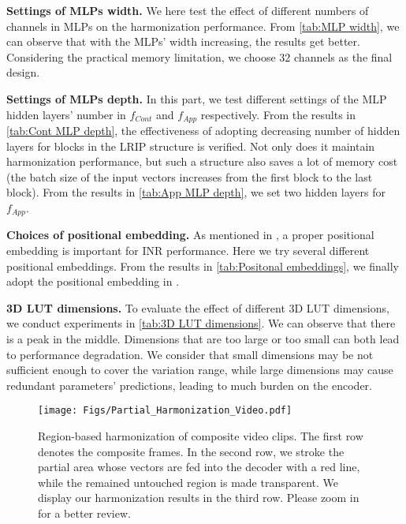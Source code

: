 \documentclass[10pt,journal,twocolumn,twoside]{IEEEtran}
\begin{document}
\textbf{Settings of MLPs width.} We here test the effect of different numbers of channels in MLPs on the harmonization performance. From \cref{tab:MLP width}, we can observe that with the MLPs' width increasing, the results get better. Considering the practical memory limitation, we choose 32 channels as the final design.

\textbf{Settings of MLPs depth.} In this part, we test different settings of the MLP hidden layers' number in $f_{Cont}$ and $f_{App}$ respectively. From the results in \cref{tab:Cont MLP depth}, the effectiveness of adopting decreasing number of hidden layers for blocks in the LRIP structure is verified. Not only does it maintain harmonization performance, but such a structure also saves a lot of memory cost (the batch size of the input vectors increases from the first block to the last block). From the results in \cref{tab:App MLP depth}, we set two hidden layers for $f_{App}$.

\textbf{Choices of positional embedding.} As mentioned in \cite{mildenhall2021nerf, tancik2020fourier}, a proper positional embedding is important for INR performance. Here we try several different positional embeddings\cite{mildenhall2021nerf, tancik2020fourier, anokhin2021image, skorokhodov2021adversarial}. From the results in \cref{tab:Positonal embeddings}, we finally adopt the positional embedding in \cite{anokhin2021image}.

\textbf{3D LUT dimensions.} To evaluate the effect of different 3D LUT dimensions, we conduct experiments in \cref{tab:3D LUT dimensions}. We can observe that there is a peak in the middle. Dimensions that are too large or too small can both lead to performance degradation. We consider that small dimensions may be not sufficient enough to cover the variation range, while large dimensions may cause redundant parameters' predictions, leading to much burden on the encoder.

\begin{figure*}[t]
  \centering
   \texttt{[image: Figs/Partial\_Harmonization\_Video.pdf]}
   \caption{Region-based harmonization of composite video clips. The first row denotes the composite frames. In the second row, we stroke the partial area whose vectors are fed into the decoder with a red line, while the remained untouched region is made transparent. We display our harmonization results in the third row. Please zoom in for a better review.}
   \label{fig:Partial_Harmonization_Video}
\end{figure*}
\end{document}
